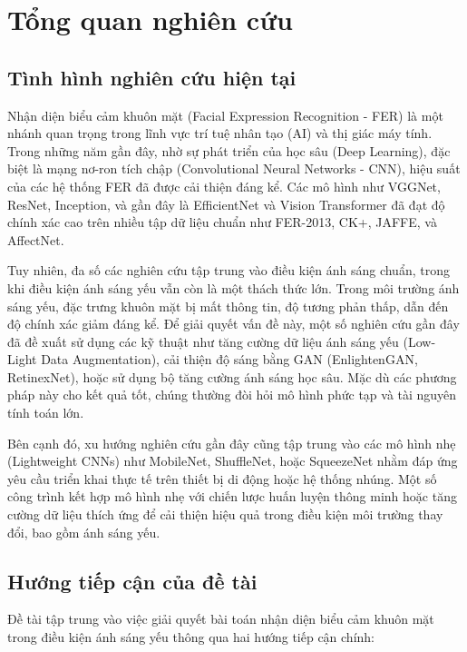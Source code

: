\section{Tổng quan nghiên cứu} %

\subsection{Tình hình nghiên cứu hiện tại} %

Nhận diện biểu cảm khuôn mặt (Facial Expression Recognition - FER) là một nhánh quan trọng trong lĩnh vực trí tuệ nhân tạo (AI) và thị giác máy tính. Trong những năm gần đây, nhờ sự phát triển của học sâu (Deep Learning), đặc biệt là mạng nơ-ron tích chập (Convolutional Neural Networks - CNN), hiệu suất của các hệ thống FER đã được cải thiện đáng kể. Các mô hình như VGGNet, ResNet, Inception, và gần đây là EfficientNet và Vision Transformer đã đạt độ chính xác cao trên nhiều tập dữ liệu chuẩn như FER-2013, CK+, JAFFE, và AffectNet.

Tuy nhiên, đa số các nghiên cứu tập trung vào điều kiện ánh sáng chuẩn, trong khi điều kiện ánh sáng yếu vẫn còn là một thách thức lớn. Trong môi trường ánh sáng yếu, đặc trưng khuôn mặt bị mất thông tin, độ tương phản thấp, dẫn đến độ chính xác giảm đáng kể. Để giải quyết vấn đề này, một số nghiên cứu gần đây đã đề xuất sử dụng các kỹ thuật như tăng cường dữ liệu ánh sáng yếu (Low-Light Data Augmentation), cải thiện độ sáng bằng GAN (EnlightenGAN, RetinexNet), hoặc sử dụng bộ tăng cường ánh sáng học sâu. Mặc dù các phương pháp này cho kết quả tốt, chúng thường đòi hỏi mô hình phức tạp và tài nguyên tính toán lớn.

Bên cạnh đó, xu hướng nghiên cứu gần đây cũng tập trung vào các mô hình nhẹ (Lightweight CNNs) như MobileNet, ShuffleNet, hoặc SqueezeNet nhằm đáp ứng yêu cầu triển khai thực tế trên thiết bị di động hoặc hệ thống nhúng. Một số công trình kết hợp mô hình nhẹ với chiến lược huấn luyện thông minh hoặc tăng cường dữ liệu thích ứng để cải thiện hiệu quả trong điều kiện môi trường thay đổi, bao gồm ánh sáng yếu.

\subsection{Hướng tiếp cận của đề tài} %

Đề tài tập trung vào việc giải quyết bài toán nhận diện biểu cảm khuôn mặt trong điều kiện ánh sáng yếu thông qua hai hướng tiếp cận chính:

